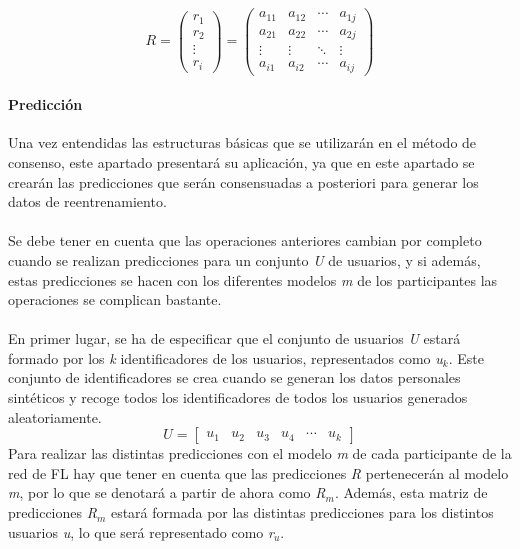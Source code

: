 \[  
    \textit{R} = 
    \begin{pmatrix}
        \textit{r$_{1}$}  \\ 
        \textit{r$_{2}$}  \\ 
        \vdots  \\ 
        \textit{r$_{i}$}
    \end{pmatrix} 
    =
    \begin{pmatrix}
        a_{11}  &  a_{12}  &  \cdots   & a_{1j} \\ 
        a_{21}  &  a_{22}  &  \cdots   & a_{2j}\\ 
        \vdots  &  \vdots  &  \ddots & \vdots  \\ 
        a_{i1}  &  a_{i2}  &  \cdots   & a_{ij}
    \end{pmatrix}
\]
\newpage
\paragraph{Predicción} Una vez entendidas las estructuras básicas que se utilizarán en el método de consenso, este apartado presentará su aplicación, ya que en este apartado se crearán las predicciones que serán consensuadas a posteriori para generar los datos de reentrenamiento.
\\ \\
Se debe tener en cuenta que las operaciones anteriores cambian por completo cuando se realizan predicciones para un conjunto \textit{U} de usuarios, y si además, estas predicciones se hacen con los diferentes modelos \textit{m} de los participantes las operaciones se complican bastante. 
\\ \\
En primer lugar, se ha de especificar que el conjunto de usuarios \textit{U} estará formado por los \textit{k} identificadores de los usuarios, representados como \textit{u$_{k}$}. Este conjunto de identificadores se crea cuando se generan los datos personales sintéticos y recoge todos los identificadores de todos los usuarios generados aleatoriamente.
\[
        \textit{U} = \begin{bmatrix} \textit{u$_{1}$} & \textit{u$_{2}$} & \textit{u$_{3}$} & \textit{u$_{4}$} & \cdots & \textit{u$_{k}$} \end{bmatrix}
\]
Para realizar las distintas predicciones con el modelo \textit{m} de cada participante de la red de FL hay que tener en cuenta que las predicciones \textit{R} pertenecerán al modelo \textit{m}, por lo que se denotará a partir de ahora como \textit{R$_{m}$}. Además, esta matriz de predicciones \textit{R$_{m}$} estará formada por las distintas predicciones para los distintos usuarios \textit{u}, lo que será representado como \textit{r$_{u}$}.
